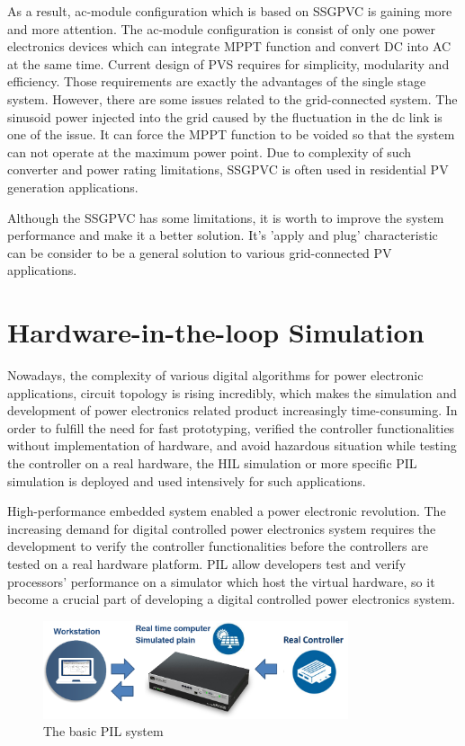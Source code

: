 As a result, ac-module configuration which is based on \gls{SSGPVC} is gaining more and more attention. The ac-module configuration is consist of only one power electronics devices which can integrate \gls{MPPT} function and convert \gls{DC} into \gls{AC} at the same time. Current design of \gls{PVS} requires for simplicity, modularity and efficiency. Those requirements are exactly the advantages of the single stage system. However, there are some issues related to the grid-connected system. The sinusoid power injected into the grid caused by the fluctuation in the dc link is one of the issue.\cite{5200525} It can force the \gls{MPPT} function to be voided so that the system can not operate at the maximum power point. Due to complexity of such converter and power rating limitations, \gls{SSGPVC} is often used in residential PV generation applications. 

Although the \gls{SSGPVC} has some limitations, it is worth to improve the system performance and make it a better solution. It's 'apply and plug' characteristic can be consider to be a general solution to various grid-connected \gls{PV} applications. 

\section{Hardware-in-the-loop Simulation}
Nowadays, the complexity of various digital algorithms for power electronic applications, circuit topology is rising incredibly, which makes the simulation and development of power electronics related product increasingly time-consuming.\cite{7497546} In order to fulfill the need for fast prototyping, verified the controller functionalities without implementation of hardware, and avoid hazardous situation while testing the controller on a real hardware, the \gls{HIL} simulation or more specific \gls{PIL} simulation is deployed and used intensively for such applications. 

High-performance embedded system enabled a power electronic revolution. The increasing demand for digital controlled power electronics system requires the development to verify the controller functionalities before the controllers are tested on a real hardware platform. \gls{PIL} allow developers test and verify processors' performance on a simulator which host the virtual hardware, so it become a crucial part of developing a digital controlled power electronics system.  
\begin{figure}[b]
    \centering
    \includegraphics[width = 0.8\textwidth]{figures/pil.png}
    \caption{The basic PIL system}
    \label{fig:pil sys}
\end{figure}

